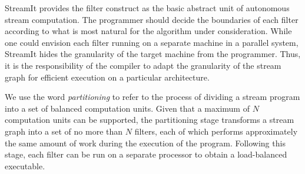 StreamIt provides the filter construct as the basic abstract unit of
autonomous stream computation.  The programmer should decide the
boundaries of each filter according to what is most natural for the
algorithm under consideration.  While one could envision each filter
running on a separate machine in a parallel system, StreamIt hides the
granularity of the target machine from the programmer.  Thus, it is
the responsibility of the compiler to adapt the granularity of the
stream graph for efficient execution on a particular architecture.

We use the word {\it partitioning} to refer to the process of dividing
a stream program into a set of balanced computation units.  Given that
a maximum of $N$ computation units can be supported, the partitioning
stage transforms a stream graph into a set of no more than $N$
filters, each of which performs approximately the same amount of work
during the execution of the program.  Following this stage, each
filter can be run on a separate processor to obtain a load-balanced
executable.



